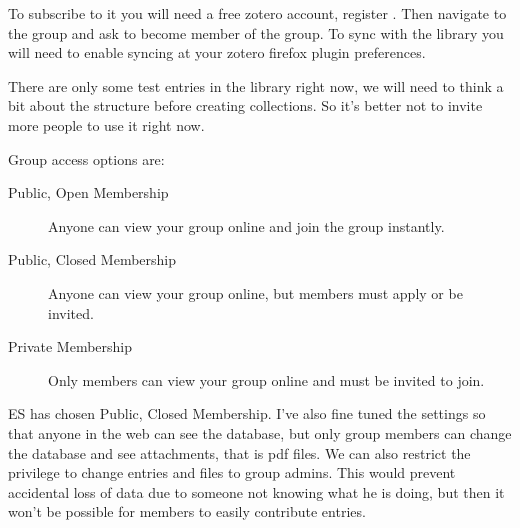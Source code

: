 \begin{description}
To subscribe to it you will need a free zotero account, register
. Then navigate
to the group  and
ask to become member of the group. To sync with the library you
will need to enable syncing at your zotero firefox plugin preferences.

There are only some test entries in the library right now, we will need
to think a bit about the structure before creating collections. So it's
better not to invite more people to use it right now.

Group access options are:
\begin{description}
 \item[Public, Open Membership] Anyone can view your group online and join the group instantly.
 \item[Public, Closed Membership] Anyone can view your group online, but members must apply or be invited.
 \item[Private Membership] Only members can view your group online and must be invited to join.
\end{description}

ES has chosen Public, Closed Membership. I've also fine tuned the settings so that anyone in the
web can see the database, but only group members can change the database and see attachments, that
is pdf files. We can also restrict the privilege to change entries and files to group admins. This would
prevent accidental loss of data due to someone not knowing what he is doing, but then it won't be
possible for members to easily contribute entries.


\end{description}
